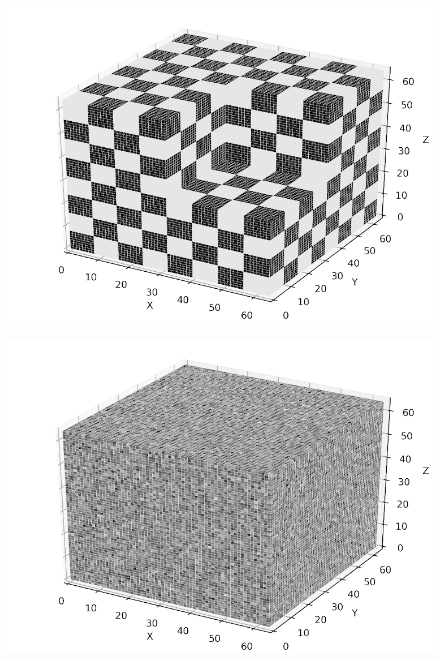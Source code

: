 \documentclass[fleqn,a4paper,oneside,openany]{book}
\begin{document}
\begin{figure}
\begin{minipage}[b]{145pt}
     \label{fig:phantom_impulse_response}
     \hspace{100pt}
   \end{minipage}
   \begin{minipage}[b]{145pt}
     \centering
     \includegraphics[trim = 0 0 0 0, clip, width=\linewidth] {phantom_figures/checkerboard.png}
     \label{fig:phantom_checkerboard}
     \hspace{100pt}
   \end{minipage}
   \begin{minipage}[b]{145pt}
     \centering
     \includegraphics[trim = 0 0 0 0, clip, width=\linewidth] {phantom_figures/noise.png}
     \label{fig:phantom_noise}

\end{minipage}
\end{figure}
\end{document}
